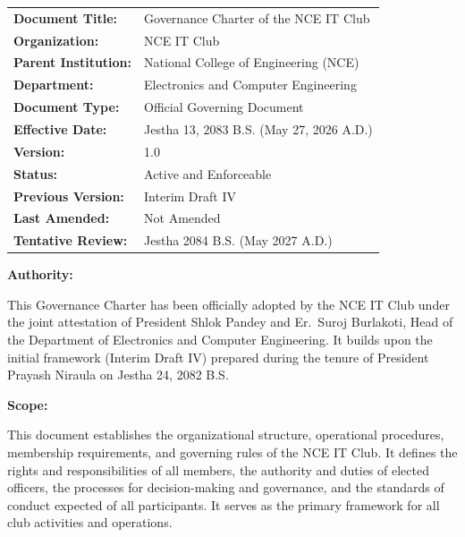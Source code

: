 \documentclass[12pt,a4paper]{article}
\begin{document}
\begin{tabular}{@{}p{4cm}p{10cm}@{}}
    \textbf{Document Title:} & Governance Charter of the NCE IT Club \\[0.5em]
    \textbf{Organization:} & NCE IT Club \\[0.5em]
    \textbf{Parent Institution:} & National College of Engineering (NCE) \\[0.5em]
    \textbf{Department:} & Electronics and Computer Engineering \\[0.5em]
    \textbf{Document Type:} & Official Governing Document \\[0.5em]
    \textbf{Effective Date:} & Jestha 13, 2083 B.S. (May 27, 2026 A.D.) \\[0.5em]
    \textbf{Version:} & 1.0 \\[0.5em]
    \textbf{Status:} & Active and Enforceable \\[0.5em]
    \textbf{Previous Version:} & Interim Draft IV \\[0.5em]
    \textbf{Last Amended:} & Not Amended \\[0.5em]
    \textbf{Tentative Review:} & Jestha 2084 B.S. (May 2027 A.D.) \\
\end{tabular}

\vspace{1.5cm}

\noindent\textbf{Authority:}

This Governance Charter has been officially adopted by the NCE IT Club under the joint attestation of President Shlok Pandey and Er.~Suroj Burlakoti, Head of the Department of Electronics and Computer Engineering. It builds upon the initial framework (Interim Draft IV) prepared during the tenure of President Prayash Niraula on Jestha 24, 2082 B.S.

\vspace{0.8cm}

\noindent\textbf{Scope:}

This document establishes the organizational structure, operational procedures, membership requirements, and governing rules of the NCE IT Club. It defines the rights and responsibilities of all members, the authority and duties of elected officers, the processes for decision-making and governance, and the standards of conduct expected of all participants. It serves as the primary framework for all club activities and operations.

\vspace{0.8cm}
\end{document}
